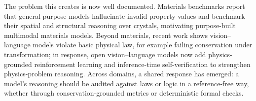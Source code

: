 \documentclass[pdflatex,sn-nature]{sn-jnl}
\begin{document}
The problem this creates is now well documented. Materials benchmarks report that
general-purpose models hallucinate invalid property values\cite{llm4matbench2024,lai2025materials}
and benchmark their spatial and structural reasoning over crystals,\cite{atomworld2025}
motivating purpose-built multimodal materials models.\cite{matterchat2026} Beyond
materials, recent work shows vision--language models violate basic physical law,
for example failing conservation under transformation;\cite{conservationbench2026}
in response, open vision--language models now add physics-grounded reinforcement
learning and inference-time self-verification to strengthen physics-problem
reasoning.\cite{p1vl2026} Across domains, a shared response has emerged:
a model's reasoning should be audited against laws or logic in a
reference-free way, whether through conservation-grounded metrics or deterministic
formal checks.\cite{conservationbench2026,neurosymclinical2026}
\end{document}

